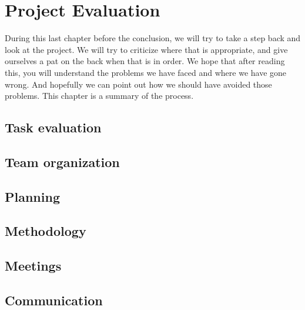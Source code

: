 \section{Project Evaluation}\label{Project Evaluation}
    During this last chapter before the conclusion, we will try to take a step back and look at the project. We will try to criticize where that is appropriate, and give ourselves a pat on the back when that is in order. We hope that after reading this, you will understand the problems we have faced and where we have gone wrong. And hopefully we can point out how we should have avoided those problems. This chapter is a summary of the process.
    
    \subsection{Task evaluation}
    \label{evaluation:task}
        
        
    \subsection{Team organization}
    \label{evaluation:team organization}
        
        
    \subsection{Planning}
    \label{evaluation:planning}
        
        
    \subsection{Methodology}
    \label{evaluation:methodology}
        
        
    \subsection{Meetings}
    \label{evaluation:meetings}
        
        
    \subsection{Communication}
    \label{evaluation:communication}
        
        
